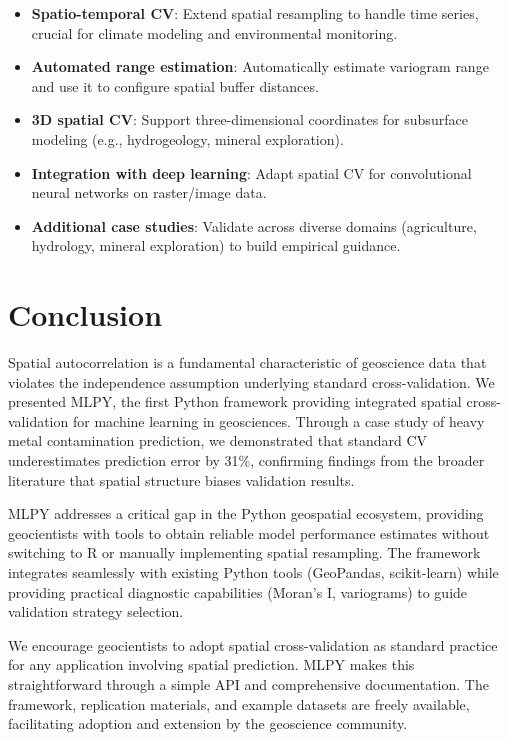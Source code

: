 \documentclass[review,12pt]{elsarticle}
\begin{document}
\begin{itemize}
\item \textbf{Spatio-temporal CV}: Extend spatial resampling to handle time series, crucial for climate modeling and environmental monitoring.
\item \textbf{Automated range estimation}: Automatically estimate variogram range and use it to configure spatial buffer distances.
\item \textbf{3D spatial CV}: Support three-dimensional coordinates for subsurface modeling (e.g., hydrogeology, mineral exploration).
\item \textbf{Integration with deep learning}: Adapt spatial CV for convolutional neural networks on raster/image data.
\item \textbf{Additional case studies}: Validate across diverse domains (agriculture, hydrology, mineral exploration) to build empirical guidance.
\end{itemize}


\section{Conclusion}\label{sec:conclusion}

Spatial autocorrelation is a fundamental characteristic of geoscience data that violates the independence assumption underlying standard cross-validation. We presented MLPY, the first Python framework providing integrated spatial cross-validation for machine learning in geosciences. Through a case study of heavy metal contamination prediction, we demonstrated that standard CV underestimates prediction error by 31\%, confirming findings from the broader literature that spatial structure biases validation results.

MLPY addresses a critical gap in the Python geospatial ecosystem, providing geocientists with tools to obtain reliable model performance estimates without switching to R or manually implementing spatial resampling. The framework integrates seamlessly with existing Python tools (GeoPandas, scikit-learn) while providing practical diagnostic capabilities (Moran's I, variograms) to guide validation strategy selection.

We encourage geocientists to adopt spatial cross-validation as standard practice for any application involving spatial prediction. MLPY makes this straightforward through a simple API and comprehensive documentation. The framework, replication materials, and example datasets are freely available, facilitating adoption and extension by the geoscience community.
\end{document}
